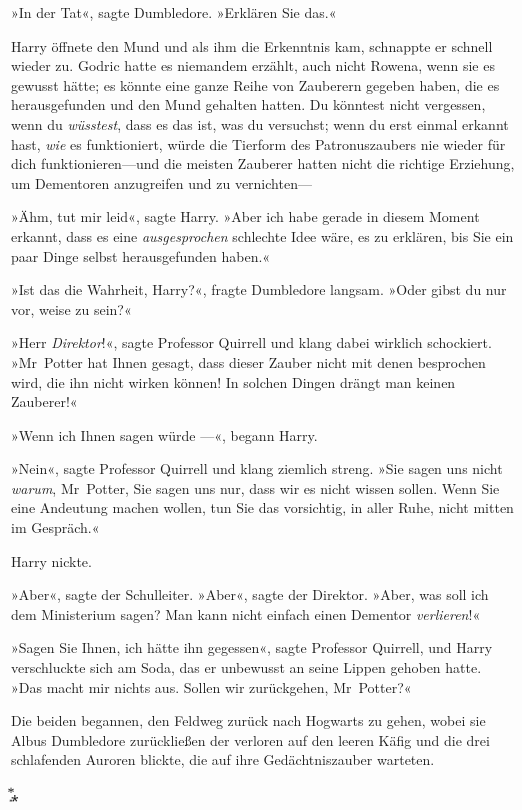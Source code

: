 {»In der Tat«, sagte Dumbledore. »Erklären Sie das.«

Harry öffnete den Mund und als ihm die Erkenntnis kam, schnappte er schnell wieder zu. Godric hatte es niemandem erzählt, auch nicht Rowena, wenn sie es gewusst hätte; es könnte eine ganze Reihe von Zauberern gegeben haben, die es herausgefunden und den Mund gehalten hatten. Du könntest nicht vergessen, wenn du \emph{wüsstest}, dass es das ist, was du versuchst; wenn du erst einmal erkannt hast, \emph{wie} es funktioniert, würde die Tierform des Patronuszaubers nie wieder für dich funktionieren—und die meisten Zauberer hatten nicht die richtige Erziehung, um Dementoren anzugreifen und zu vernichten—

»Ähm, tut mir leid«, sagte Harry. »Aber ich habe gerade in diesem Moment erkannt, dass es eine \emph{ausgesprochen} schlechte Idee wäre, es zu erklären, bis Sie ein paar Dinge selbst herausgefunden haben.«

»Ist das die Wahrheit, Harry?«, fragte Dumbledore langsam. »Oder gibst du nur vor, weise zu sein?«

»Herr \emph{Direktor}!«, sagte Professor Quirrell und klang dabei wirklich schockiert. »Mr~Potter hat Ihnen gesagt, dass dieser Zauber nicht mit denen besprochen wird, die ihn nicht wirken können! In solchen Dingen drängt man keinen Zauberer!«

»Wenn ich Ihnen sagen würde —«, begann Harry.

»Nein«, sagte Professor Quirrell und klang ziemlich streng. »Sie sagen uns nicht \emph{warum}, Mr~Potter, Sie sagen uns nur, dass wir es nicht wissen sollen. Wenn Sie eine Andeutung machen wollen, tun Sie das vorsichtig, in aller Ruhe, nicht mitten im Gespräch.«

Harry nickte.

»Aber«, sagte der Schulleiter. »Aber«, sagte der Direktor. »Aber, was soll ich dem Ministerium sagen? Man kann nicht einfach einen Dementor \emph{verlieren}!«

»Sagen Sie Ihnen, ich hätte ihn gegessen«, sagte Professor Quirrell, und Harry verschluckte sich am Soda, das er unbewusst an seine Lippen gehoben hatte. »Das macht mir nichts aus. Sollen wir zurückgehen, Mr~Potter?«

Die beiden begannen, den Feldweg zurück nach Hogwarts zu gehen, wobei sie Albus Dumbledore zurückließen der verloren auf den leeren Käfig und die drei schlafenden Auroren blickte, die auf ihre Gedächtniszauber warteten.

͙⃰⁎

}
